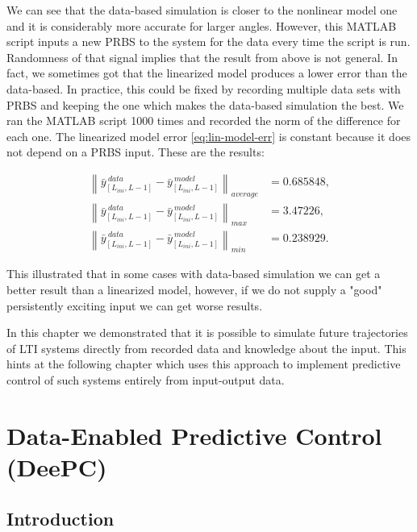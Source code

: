 \documentclass[12pt,a4paper]{report}
\newcommand{\norm}[1]{\left\lVert #1 \right\rVert}
\begin{document}
We can see that the data-based simulation is closer to the nonlinear model one and it is considerably more accurate for larger angles.
However, this MATLAB script inputs a new PRBS to the system for the data every time the script is run. Randomness of that signal implies that the result from above is not
general. In fact, we sometimes got that the linearized model produces a lower error than the data-based. In practice, this could be fixed by recording multiple data sets
with PRBS and keeping the one which makes the data-based simulation the best. We ran the MATLAB script 1000 times and recorded the norm of the difference for
each one. The linearized model error \eqref{eq:lin-model-err} is constant because it does not depend on a PRBS input. These are the results:

\begin{align*}
    \norm{\bar{y}_{[L_{ini}, L-1]}^{\ data} - \bar{y}_{[L_{ini}, L-1]}^{\ model}}_{average} &= 0.685848, \\
    \norm{\bar{y}_{[L_{ini}, L-1]}^{\ data} - \bar{y}_{[L_{ini}, L-1]}^{\ model}}_{max} &=  3.47226, \\
    \norm{\bar{y}_{[L_{ini}, L-1]}^{\ data} - \bar{y}_{[L_{ini}, L-1]}^{\ model}}_{min} &= 0.238929.
\end{align*}

This illustrated that in some cases with data-based simulation we can get a better result than a linearized model, however, if we do not supply a "good" persistently exciting input we can get worse results.

\vspace{1em}

In this chapter we demonstrated that it is possible to simulate future trajectories of LTI systems directly from recorded data and knowledge about the input. This
hints at the following chapter which uses this approach to implement predictive control of such systems entirely from input-output data.

\newpage

\chapter{Data-Enabled Predictive Control (DeePC)}

\section{Introduction}
\end{document}
